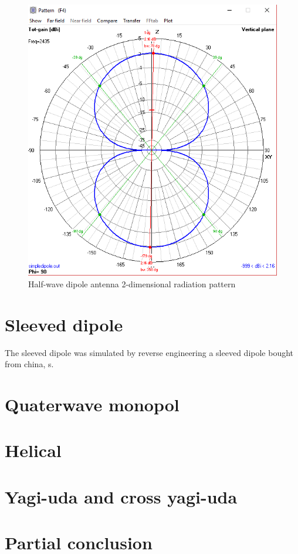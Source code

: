\begin{figure}[h!]
\centering
\includegraphics[scale=0.5]{figures/DipoleRadiationPattern.PNG}
\caption{Half-wave dipole antenna 2-dimensional radiation pattern}
\end{figure}

\section{Sleeved dipole}
The sleeved dipole was simulated by reverse engineering a sleeved dipole bought from china, s. 




\section{Quaterwave monopol}
\section{Helical}

\section{Yagi-uda and cross yagi-uda}

\section{Partial conclusion}